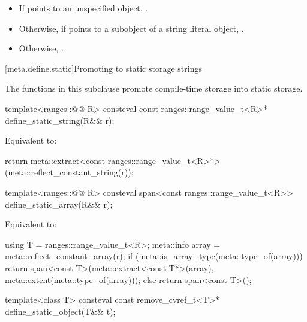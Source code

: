 \begin{itemdescr}
\pnum
\returns
\begin{itemize}
\item
  If  points to an unspecified object,
  .
\item
  Otherwise, if  points to a subobject
  of a string literal object,
  .
\item
  Otherwise, .
\end{itemize}
\end{itemdescr}

[meta.define.static]{Promoting to static storage strings}

\pnum
The functions in this subclause promote compile-time storage into static storage.

%
\begin{itemdecl}
template<ranges::@@ R>
  consteval const ranges::range_value_t<R>* define_static_string(R&& r);
\end{itemdecl}

\begin{itemdescr}
\pnum
\effects
Equivalent to:
\begin{codeblock}
return meta::extract<const ranges::range_value_t<R>*>(meta::reflect_constant_string(r));
\end{codeblock}
\end{itemdescr}

%
\begin{itemdecl}
template<ranges::@@ R>
  consteval span<const ranges::range_value_t<R>> define_static_array(R&& r);
\end{itemdecl}

\begin{itemdescr}
\pnum
\effects
Equivalent to:
\begin{codeblock}
using T = ranges::range_value_t<R>;
meta::info array = meta::reflect_constant_array(r);
if (meta::is_array_type(meta::type_of(array))) {
  return span<const T>(meta::extract<const T*>(array), meta::extent(meta::type_of(array)));
} else {
  return span<const T>();
}
\end{codeblock}
\end{itemdescr}

%
\begin{itemdecl}
template<class T>
  consteval const remove_cvref_t<T>* define_static_object(T&& t);
\end{itemdecl}

